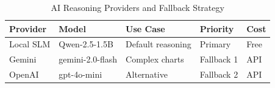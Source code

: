 \begin{table}[htbp]
\centering
\caption{AI Reasoning Providers and Fallback Strategy}
\label{tab:ai-providers}
\begin{tabular}{@{}lllll@{}}
\toprule
\textbf{Provider} & \textbf{Model} & \textbf{Use Case} & \textbf{Priority} & \textbf{Cost} \\
\midrule
Local SLM & Qwen-2.5-1.5B    & Default reasoning   & Primary    & Free \\
Gemini    & gemini-2.0-flash  & Complex charts       & Fallback 1 & API \\
OpenAI    & gpt-4o-mini       & Alternative          & Fallback 2 & API \\
\bottomrule
\end{tabular}
\end{table}